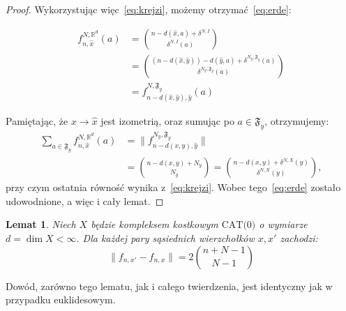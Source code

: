 \documentclass[licencjacka]{pracamgr}
\theoremstyle{definition}
\theoremstyle{definition}
\theoremstyle{definition}
\theoremstyle{definition}
\theoremstyle{definition}
\theoremstyle{plain}
\newtheorem{lemma}{Lemat}[section]
\theoremstyle{plain}
\begin{document}
\begin{proof}
	Wykorzystując więc~\ref{eq:krejzi}, możemy otrzymać~\ref{eq:erde}:

	\begin{align*} 
	f_{n, \hat x}^{N, \mathbb{R}^d} (a) & = {n - d(\hat x, a) + \delta^{N,I} \choose \delta^{N,I}
	(a)} \\
	& = {(n - d(\hat x, \hat y)) - d(\hat y, a) + \delta^{N_y, \mathfrak{F}_y} (a) \choose 
	\delta^{N_y, \mathfrak{F}_y}(a)} \\
	& = f_{n - d(\hat x, \hat y), \hat y}^{N, \mathfrak{F}_y} (a)
	\end{align*}

	Pamiętając, że  $ x \rightarrow \hat x$ jest izometrią, oraz sumując po $ a \in 
	\mathfrak{F}_y $, otrzymujemy:
	\begin{align*}
	\sum\limits_{a \in \mathfrak{F}_y} f_{n,\hat x}^{N, \mathbb{R}^d}(a) &= 
	\|f_{n - d(x,y), \hat y}^{N_y, \mathfrak{F}_y}\| \\
	& = {n - d(x,y) + N_y \choose N_y} = {n - d(x,y) + \delta^{N,X}(y) \choose \delta^{N,X}(y)},
	\end{align*}
	przy czym ostatnia równość wynika z~\ref{eq:krejzi}. Wobec tego~\ref{eq:erde} zostało 
	udowodnione, a więc i cały lemat.
\end{proof}
\begin{lemma}
	Niech $ X $ będzie kompleksem kostkowym $ \text{CAT(0)} $ o wymiarze $ d = \dim X < \infty $.
	Dla każdej pary sąsiednich wierzchołków $ x,x' $ zachodzi:
	$$ \| f_{n,x'} - f_{n,x}\| = 2 {n + N - 1 \choose N - 1} $$
\end{lemma}
Dowód, zarówno tego lematu, jak i całego twierdzenia, 
jest identyczny jak w przypadku euklidesowym.



\end{document}
